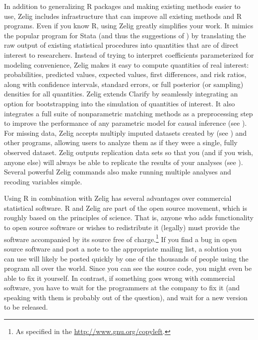 In addition to generalizing R packages and making existing methods
easier to use, Zelig includes infrastructure that can improve all
existing methods and R programs.  Even if you know R, using Zelig
greatly simplifies your work.  It mimics the popular
 program
for Stata (and thus the suggestions of )
\nocite{KinTomWit00} by translating the raw output of existing statistical
procedures into quantities that are of direct
interest to researchers.  Instead of trying to interpret coefficients
parameterized for modeling convenience, Zelig makes it easy to compute
quantities of real interest: probabilities, predicted values, expected
values, first differences, and risk ratios, along with confidence
intervals, standard errors, or full posterior (or sampling) densities
for all quantities.  Zelig extends Clarify by seamlessly integrating
an option for bootstrapping into the simulation of quantities of
interest.  It also integrates a full suite of nonparametric matching
methods as a preprocessing step to improve the performance of any
parametric model for causal inference (see
).  For missing data,
Zelig accepts multiply imputed datasets created by
 (see
)\nocite{KinHonJos01}
and other programs, allowing users to analyze them as if they were a
single, fully observed dataset.  Zelig outputs replication data sets
so that you (and if you wish, anyone else) will always be able to
replicate the results of your analyses (see ).\nocite{King95}
Several powerful Zelig commands also make running multiple analyses
and recoding variables simple.

Using R in combination with Zelig has several advantages over
commercial statistical software.  R and Zelig are part of the open
source movement, which is roughly based on the principles of science.
That is, anyone who adds functionality to open source software or
wishes to redistribute it (legally) must provide the software
accompanied by its source free of charge.\footnote{As specified in the
  \url{http://www.gnu.org/copyleft}.}  If you find a bug in open
source software and post a note to the appropriate mailing list, a
solution you can use will likely be posted quickly by one of the
thousands of people using the program all over the world.  Since you
can see the source code, you might even be able to fix it yourself.
In contrast, if something goes wrong with commercial software, you
have to wait for the programmers at the company to fix it (and
speaking with them is probably out of the question), and wait for a
new version to be released.

